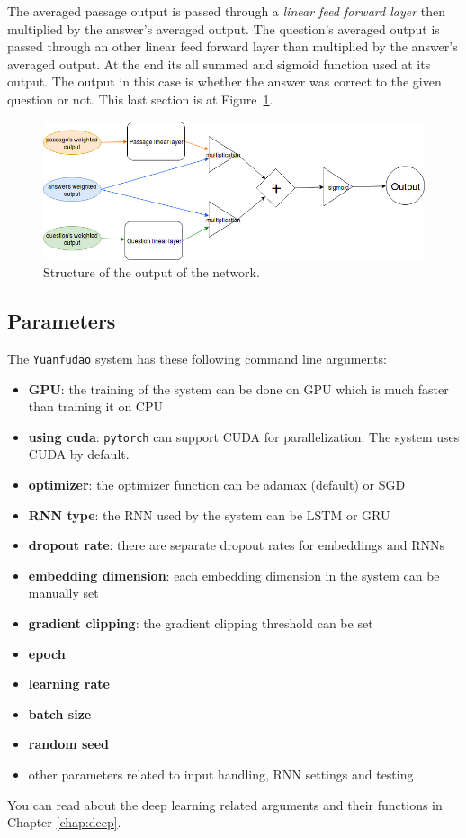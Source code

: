 The averaged passage output is passed through a \textit{linear feed forward layer} then multiplied by the answer's averaged output. The question's averaged output is passed through an other linear feed forward layer than multiplied by the answer's averaged output. At the end its all summed and sigmoid function used at its output. The output in this case is whether the answer was correct to the given question or not. This last section is at Figure~\ref{fig:output}.
\begin{figure}[!htb]
	\centering
	\includegraphics[scale=0.5]{TriAN_output.jpg}
	\caption{Structure of the output of the network.}
	\label{fig:output}
\end{figure}


\subsection{Parameters}
\begin{minipage}{\textwidth}
The \texttt{Yuanfudao} system has these following command line arguments:
\begin{itemize}
	\item \textbf{GPU}: the training of the system can be done on GPU which is much faster than training it on CPU
	\item \textbf{using cuda}: \texttt{pytorch} can support CUDA for parallelization. The system uses CUDA by default.
	\item \textbf{optimizer}: the optimizer function can be adamax (default) or SGD
	\item \textbf{RNN type}: the RNN used by the system can be LSTM or GRU
	\item \textbf{dropout rate}: there are separate dropout rates for embeddings and RNNs
	\item \textbf{embedding dimension}: each embedding dimension in the system can be manually set
	\item \textbf{gradient clipping}: the gradient clipping threshold can be set
	\item \textbf{epoch}
	\item \textbf{learning rate}
	\item \textbf{batch size}
	\item \textbf{random seed}
	\item other parameters related to input handling, RNN settings and testing
\end{itemize}
You can read about the deep learning related arguments and their functions in Chapter \ref{chap:deep}.
\end{minipage}

